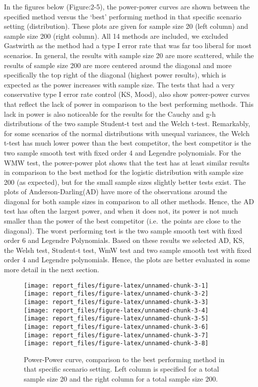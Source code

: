 \documentclass[
]{article}
\begin{document}
In the figures below (Figure:2-5), the power-power curves are shown
between the specified method versus the `best' performing method in that
specific scenario setting (distribution). These plots are given for
sample size 20 (left column) and sample size 200 (right column). All 14
methods are included, we excluded Gastwirth as the method had a type I
error rate that was far too liberal for most scenarios. In general, the
results with sample size 20 are more scattered, while the results of
sample size 200 are more centered around the diagonal and more
specifically the top right of the diagonal (highest power results),
which is expected as the power increases with sample size. The tests
that had a very conservative type I error rate control (KS, Mood), also
show power-power curves that reflect the lack of power in comparison to
the best performing methods. This lack in power is also noticeable for
the results for the Cauchy and g-h distributions of the two sample
Student-t test and the Welch t-test. Remarkably, for some scenarios of
the normal distributions with unequal variances, the Welch t-test has
much lower power than the best competitor, the best competitor is the
two sample smooth test with fixed order 4 and Legendre polynomials. For
the WMW test, the power-power plot shows that the test has at least
similar results in comparison to the best method for the logistic
distribution with sample size 200 (as expected), but for the small
sample sizes slightly better tests exist. The plots of
Anderson-Darling(AD) have more of the observations around the diagonal
for both sample sizes in comparison to all other methods. Hence, the AD
test has often the largest power, and when it does not, its power is not
much smaller than the power of the best competitor (i.e.~the points are
close to the diagonal). The worst performing test is the two sample
smooth test with fixed order 6 and Legendre Polynomials. Based on these
results we selected AD, KS, the Welsh test, Student-t test, WmW test and
two sample smooth test with fixed order 4 and Legendre polynomials.
Hence, the plots are better evaluated in some more detail in the next
section.

\begin{figure}[H]
\texttt{[image: report\_files/figure-latex/unnamed-chunk-3-1]} \texttt{[image: report\_files/figure-latex/unnamed-chunk-3-2]} \texttt{[image: report\_files/figure-latex/unnamed-chunk-3-3]} \texttt{[image: report\_files/figure-latex/unnamed-chunk-3-4]} \texttt{[image: report\_files/figure-latex/unnamed-chunk-3-5]} \texttt{[image: report\_files/figure-latex/unnamed-chunk-3-6]} \texttt{[image: report\_files/figure-latex/unnamed-chunk-3-7]} \texttt{[image: report\_files/figure-latex/unnamed-chunk-3-8]} \caption{Power-Power curve, comparison to the best performing method in that specific scenario setting. Left column is specified for a total sample size 20 and the right column for a total sample size 200.  }\label{fig:unnamed-chunk-3}
\end{figure}
\end{document}

